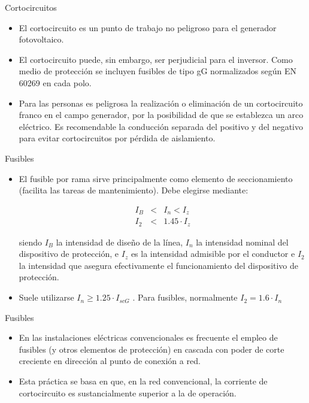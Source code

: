 \documentclass[xcolor={usenames,svgnames,dvipsnames}]{beamer}
\begin{document}
\begin{frame}[label=sec-5-1-6]{Cortocircuitos}
\begin{itemize}
\item El \alert{cortocircuito} es un punto de trabajo \alert{no peligroso para el
generador fotovoltaico}.

\item El cortocircuito puede, sin embargo, ser \alert{perjudicial para el
inversor}. Como medio de protección se incluyen fusibles de tipo gG
normalizados según EN 60269 en cada polo.

\item Para las personas es \alert{peligrosa la realización o eliminación de un
cortocircuito franco en el campo generador}, por la posibilidad de
que se establezca un arco eléctrico. Es recomendable la \alert{conducción
separada} del positivo y del negativo para evitar cortocircuitos por
pérdida de aislamiento.
\end{itemize}
\end{frame}

\begin{frame}[label=sec-5-1-7]{Fusibles}
\begin{itemize}
\item El \alert{fusible por rama} sirve principalmente como \alert{elemento de
seccionamiento} (facilita las tareas de mantenimiento). Debe elegirse
mediante:

$$\begin{aligned}
   I_{B} & < & I_{n}<I_{z}\\
   I_{2} & < & 1.45\cdot I_{z}\end{aligned}$$

siendo $I_{B}$ la intensidad de diseño de la línea, $I_{n}$ la
intensidad nominal del dispositivo de protección, e $I_{z}$ es la
intensidad admisible por el conductor e $I_{2}$ la intensidad que
asegura efectivamente el funcionamiento del dispositivo de
protección.

\item Suele utilizarse $I_{n}\geq1.25\cdot I_{scG}$ . Para fusibles,
normalmente $I_{2}=1.6\cdot I_{n}$
\end{itemize}
\end{frame}

\begin{frame}[label=sec-5-1-8]{Fusibles}
\begin{itemize}
\item En las instalaciones eléctricas convencionales es frecuente el empleo
de fusibles (y otros elementos de protección) en cascada con poder de
corte creciente en dirección al punto de conexión a red.

\item Esta práctica se basa en que, en la red convencional, la corriente de
cortocircuito es sustancialmente superior a la de operación.
\end{itemize}
\end{frame}
\end{document}
